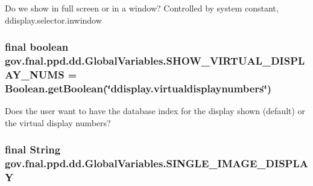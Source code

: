 Do we show in full screen or in a window? Controlled by system constant, ddisplay.\-selector.\-inwindow \hypertarget{classgov_1_1fnal_1_1ppd_1_1dd_1_1GlobalVariables_a7ccfa5abda77efe03cd888f14d4171a3}{
\subsubsection[{S\-H\-O\-W\-\_\-\-V\-I\-R\-T\-U\-A\-L\-\_\-\-D\-I\-S\-P\-L\-A\-Y\-\_\-\-N\-U\-M\-S}]{\setlength{\rightskip}{0pt plus 5cm}final boolean gov.\-fnal.\-ppd.\-dd.\-Global\-Variables.\-S\-H\-O\-W\-\_\-\-V\-I\-R\-T\-U\-A\-L\-\_\-\-D\-I\-S\-P\-L\-A\-Y\-\_\-\-N\-U\-M\-S = Boolean.\-get\-Boolean(\char`\"{}ddisplay.\-virtualdisplaynumbers\char`\"{})\hspace{0.3cm}{\ttfamily [static]}}}\label{classgov_1_1fnal_1_1ppd_1_1dd_1_1GlobalVariables_a7ccfa5abda77efe03cd888f14d4171a3}
Does the user want to have the database index for the display shown (default) or the virtual display numbers? \hypertarget{classgov_1_1fnal_1_1ppd_1_1dd_1_1GlobalVariables_ab018dd06fadda0d1bc99e7de66894e84}{
\subsubsection[{S\-I\-N\-G\-L\-E\-\_\-\-I\-M\-A\-G\-E\-\_\-\-D\-I\-S\-P\-L\-A\-Y}]{\setlength{\rightskip}{0pt plus 5cm}final String gov.\-fnal.\-ppd.\-dd.\-Global\-Variables.\-S\-I\-N\-G\-L\-E\-\_\-\-I\-M\-A\-G\-E\-\_\-\-D\-I\-S\-P\-L\-A\-Y\hspace{0.3cm}{\ttfamily [static]}}}\label{classgov_1_1fnal_1_1ppd_1_1dd_1_1GlobalVariables_ab018dd06fadda0d1bc99e7de66894e84}
